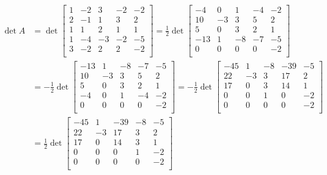 \documentclass{article}
\begin{document}
\[\begin{aligned}
    \det{A} &= \det{\begin{bmatrix}
        1 & -2 &  3 & -2 & -2 \\
        2 & -1 &  1 &  3 &  2 \\
        1 &  1 &  2 &  1 &  1 \\
        1 & -4 & -3 & -2 & -5 \\
        3 & -2 &  2 &  2 & -2 \\
    \end{bmatrix}} = \frac{1}{2}\det{\begin{bmatrix}
         -4 &  0 &  1 & -4 & -2 \\
         10 & -3 &  3 &  5 &  2 \\
          5 &  0 &  3 &  2 &  1 \\
        -13 &  1 & -8 & -7 & -5 \\
          0 &  0 &  0 &  0 & -2 \\
    \end{bmatrix}} \\ &= -\frac{1}{2}\det{\begin{bmatrix}
        -13 &  1 & -8 & -7 & -5 \\
         10 & -3 &  3 &  5 &  2 \\
          5 &  0 &  3 &  2 &  1 \\
         -4 &  0 &  1 & -4 & -2 \\
          0 &  0 &  0 &  0 & -2 \\
    \end{bmatrix}} = -\frac{1}{2}\det{\begin{bmatrix}
        -45 &  1 & -8 & -39 & -5 \\
         22 & -3 &  3 &  17 &  2 \\
         17 &  0 &  3 &  14 &  1 \\
          0 &  0 &  1 &   0 & -2 \\
          0 &  0 &  0 &   0 & -2 \\
    \end{bmatrix}} \\ &= \frac{1}{2}\det{\begin{bmatrix}
        -45 &  1 & -39 & -8 & -5 \\
         22 & -3 &  17 &  3 &  2 \\
         17 &  0 &  14 &  3 &  1 \\
          0 &  0 &   0 &  1 & -2 \\
          0 &  0 &   0 &  0 & -2 \\

\end{bmatrix}}
\end{aligned}\]
\end{document}
